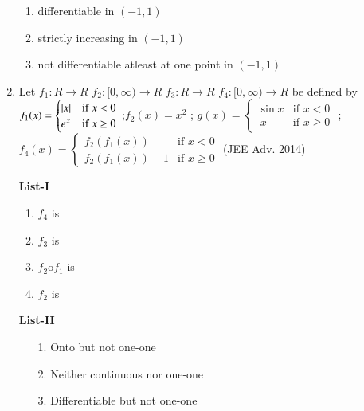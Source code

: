 \documentclass[journal,12pt,twocolumn]{IEEEtran}
\theoremstyle{remark}
\begin{document}
\begin{enumerate}
\begin{multicols}{2}
\begin{enumerate}
					\item differentiable in $(-1,1)$

					\item strictly increasing in $(-1,1)$

					\item  not differentiable atleast at one point in  $(-1,1)$
				\end{enumerate}
			\end{multicols}
		\item Let $f_1:R\rightarrow R$ $f_2:[0,\infty)\rightarrow R$ $f_3:R\rightarrow R$ $f_4:[0,\infty)\rightarrow R$ be defined by 
         $f_1(x) =
        \begin{cases}
		\left\vert x\right\vert & \text{if } x < 0 \\
                 e^x & \text{if } x \geq 0 
                 \end{cases}$
                 ;$f_2(x)=x^2$ ; $g(x) =
                 \begin{cases}
			 \sin{x} & \text{if }  x < 0 \\
                    \ x & \text{if }  x\geq 0
                  \end{cases}$
                  ;$f_4(x) =
                  \begin{cases}
                     f_2(f_1(x)) & \text{if } x < 0 \\
                     f_2(f_1(x))-1 & \text{if } x \geq 0 
                  \end{cases}$
                  \hfill(JEE Adv. 2014)
                 \begin{multicols}{2} 
				\textbf{List-I} 
				\begin{enumerate}[label=\Alph*., start=16]
					\item $f_4$ is
					\item $f_3$ is 
					\item $f_2$o$f_1$ is 
					\item $f_2$ is
				\end{enumerate}
				\columnbreak
				\textbf{List-II}
				\begin{enumerate}
					\item[1.]  Onto but not one-one 

					\item[2.]  Neither continuous nor one-one 

					\item[3.]  Differentiable but not one-one 


\end{enumerate}
\end{multicols}
\end{enumerate}
\end{document}
